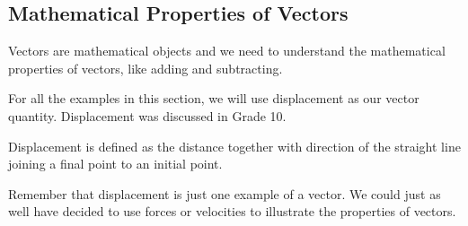             \subsection{ Mathematical Properties of Vectors}
            \nopagebreak
      \label{m38813*id188277}Vectors are mathematical objects and we need to understand the mathematical properties of vectors, like adding and subtracting.\par 
      \label{m38813*id188281}For all the examples in this section, we will use displacement as our vector quantity. Displacement was discussed in
Grade 10.\par 
      \label{m38813*id188286}Displacement is defined as the distance together with direction of the straight line joining a final point to an initial point.\par 
      \label{m38813*id188290}Remember that displacement is just one example of a vector. We could just as well have decided to use forces or velocities to illustrate the properties of vectors.\par 
      \label{m38813*uid35}
